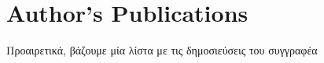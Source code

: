 \chapter*{Author's Publications}
\thispagestyle{empty}


Προαιρετικά, βάζουμε μία λίστα με τις %
δημοσιεύσεις του συγγραφέα%
